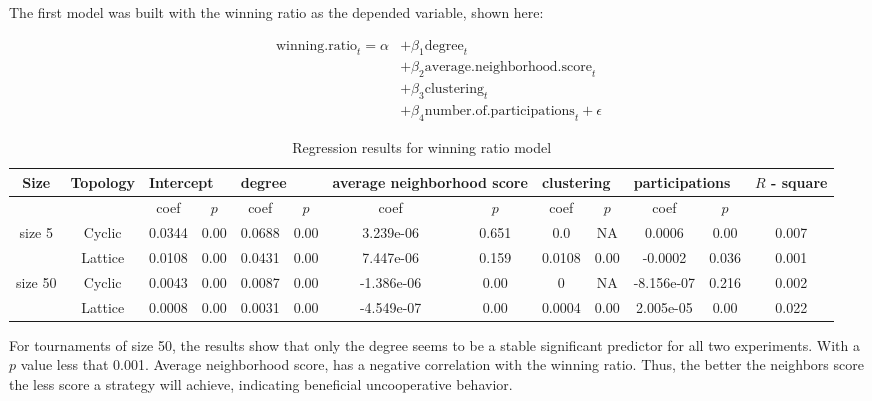The first model was built with the winning ratio as the depended variable,
shown here:

\begin{align}
	\mathrm{winning.ratio}_{t} = \alpha
	  & + \beta_{1}  \mathrm{degree}_{t}                              \\
	  & + \beta_{2}  \mathrm{average.neighborhood.score}_{t}          \\
	  & + \beta_{3}  \mathrm{clustering}_{t}                          \\
	  & + \beta_{4}  \mathrm{number.of.participations}_{t} + \epsilon
\end{align}

\begin{table}[!hbtp]
	\centering
	\begin{adjustbox}{width=1\textwidth}
		\small
		\begin{tabular}{ccccccccccccc}
				\toprule
			Size 		& \multicolumn{1}{|l|}{Topology} & \multicolumn{2}{l|}{Intercept} & \multicolumn{2}{l|}{degree} & \multicolumn{2}{l|}{average neighborhood score} & \multicolumn{2}{l|}{clustering} & \multicolumn{2}{l|}{participations} & \(R\) - square \\ \midrule
			        &         & coef   & \(p\)    & coef   & \(p\)    & coef       & \(p\)     & coef   & \(p\)    & coef       & \(p\)     &       \\ \midrule
			size 5  & Cyclic  & 0.0344 & 0.00 & 0.0688 & 0.00 & 3.239e-06  & 0.651 & 0.0    & NA   & 0.0006     & 0.00  & 0.007 \\ \midrule
			        & Lattice & 0.0108 & 0.00 & 0.0431 & 0.00 & 7.447e-06  & 0.159 & 0.0108 & 0.00 & -0.0002    & 0.036 & 0.001 \\ \midrule
			size 50 & Cyclic  & 0.0043 & 0.00 & 0.0087 & 0.00 & -1.386e-06 & 0.00  & 0      & NA   & -8.156e-07 & 0.216 & 0.002 \\ \midrule
			        & Lattice & 0.0008 & 0.00 & 0.0031 & 0.00 & -4.549e-07 & 0.00  & 0.0004 & 0.00 & 2.005e-05  & 0.00  & 0.022 \\ \bottomrule
		\end{tabular}
	\end{adjustbox}
	\caption{Regression results for winning ratio model}
	\label{regression-winning}
\end{table}

For tournaments of size 50, the results show that only the degree seems
to be a stable significant predictor for all two experiments. With a \(p\)
value less that 0.001. Average neighborhood score, has a negative correlation
with the winning ratio. Thus, the better the neighbors score the
less score a strategy will achieve, indicating beneficial uncooperative behavior.

